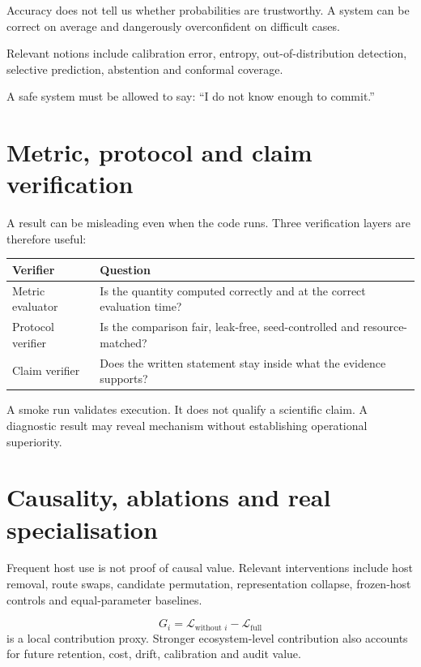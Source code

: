 \documentclass[11pt,a4paper]{article}
\newcommand{\tablehead}[1]{\cellcolor{DeepTeal}\color{white}\bfseries #1}
\begin{document}
Accuracy does not tell us whether probabilities are trustworthy. A system can be correct on average and dangerously overconfident on difficult cases.

Relevant notions include calibration error, entropy, out-of-distribution detection, selective prediction, abstention and conformal coverage.

\begin{keybox}
A safe system must be allowed to say: ``I do not know enough to commit.''
\end{keybox}

\section{Metric, protocol and claim verification}

A result can be misleading even when the code runs. Three verification layers are therefore useful:

\begin{tabularx}{\textwidth}{p{3.1cm}X}
\toprule
\tablehead{Verifier} & \tablehead{Question}\\
\midrule
Metric evaluator & Is the quantity computed correctly and at the correct evaluation time?\\
Protocol verifier & Is the comparison fair, leak-free, seed-controlled and resource-matched?\\
Claim verifier & Does the written statement stay inside what the evidence supports?\\
\bottomrule
\end{tabularx}

A smoke run validates execution. It does not qualify a scientific claim. A diagnostic result may reveal mechanism without establishing operational superiority.

\section{Causality, ablations and real specialisation}

Frequent host use is not proof of causal value. Relevant interventions include host removal, route swaps, candidate permutation, representation collapse, frozen-host controls and equal-parameter baselines.

\[
G_i=\mathcal L_{\text{without }i}-\mathcal L_{\text{full}}
\]
is a local contribution proxy. Stronger ecosystem-level contribution also accounts for future retention, cost, drift, calibration and audit value.
\end{document}

